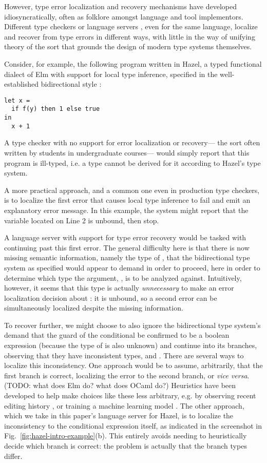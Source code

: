 However, type error localization and recovery mechanisms have developed idiosyncratically, 
often as folklore amongst language and tool implementors. 
Different type checkers or language servers \cite{langauge-servers,merlin}, even for the same language, localize and recover from type errors in different ways, 
with little in the way of unifying theory of the sort that grounds the design of modern type systems themselves.

Consider, for example, the following program written in Hazel, a typed functional dialect of Elm \cite{elm} with 
support for local type inference, specified in the well-established bidirectional style \cite{pierce,hazelnut,BidirTyping}: 
\begin{lstlisting}[numbers=none]
let x = 
  if f(y) then 1 else true
in 
  x + 1
\end{lstlisting}
A type checker with no support for error localization or recovery---%
the sort often written by students in undergraduate courses---%
would simply report that this program is ill-typed, 
i.e. a type cannot be derived for it according to Hazel's type system. 

A more practical approach, and a common one even in production type checkers, 
is to localize the first error that causes local type inference to fail and emit an explanatory error message.
In this example, the system might report that the variable  located on Line 2 is unbound, then stop.

A language server with support for type error recovery would 
 be tasked with continuing past this first error.
 The general difficulty here is that there is now missing semantic information, namely the type of , that 
 the bidirectional type system as specified 
 would appear to demand in order to proceed, here in order to determine which type the argument, , is to be analyzed against.
 Intuitively, however, it seems that this type is actually \emph{unnecessary} to make an error localization decision about : 
it is unbound, so a second error can be simultaneously localized despite the missing information.

To recover further, we might choose to also ignore the bidirectional type system's demand that the guard of the conditional be confirmed to be a boolean expression 
(because the type of  is also unknown) 
and continue into its branches, observing that they have inconsistent types,  and . 
There are several ways to localize this inconsistency. 
One approach would be to assume, arbitrarily, that the first branch is correct, localizing the error to the second branch, or \emph{vice versa}.
(TODO: what does Elm do? what does OCaml do?)
Heuristics have been developed to help make choices like these less arbitrary, e.g. 
by observing recent editing history , 
or training a machine learning model . 
The other approach, which we take in this paper's language server for Hazel, is to localize the inconsistency to the conditional expression itself, as indicated in
the screenshot in Fig.~\ref{fig:hazel-intro-example}(b). 
This entirely avoids needing to heuristically decide which branch is correct: the problem is actually that the branch types differ.


